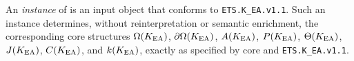 %
%
%

\label{sec:defns}

\newcommand{\ETSK}{\texttt{ETS.\allowbreak K\_EA.\allowbreak v1.1}}

\begin{definition}
An \emph{instance} of \KEA{} is an input object that conforms to \ETSK. Such an
instance determines, without reinterpretation or semantic enrichment, the
corresponding \OC{} core structures
\(\Omega(K_{\mathrm{EA}})\), \(\partial \Omega(K_{\mathrm{EA}})\), \(A(K_{\mathrm{EA}})\), \(P(K_{\mathrm{EA}})\), \(\Theta(K_{\mathrm{EA}})\),
\(J(K_{\mathrm{EA}})\), \(C(K_{\mathrm{EA}})\), and \(k(K_{\mathrm{EA}})\), exactly as specified by
\OC{} core and \ETSK.
\end{definition}

